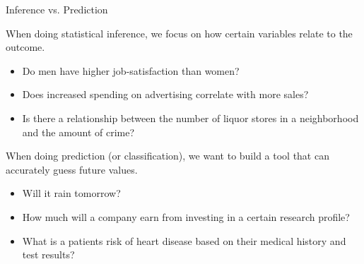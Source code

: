 \documentclass[10pt]{beamer}\usepackage[]{graphicx}\usepackage[]{color}
\begin{document}

\begin{frame}{Inference vs. Prediction}

  When doing statistical inference, we focus on how certain variables relate to
  the outcome.
  \begin{itemize}
  \item Do men have higher job-satisfaction than women?
  \item Does increased spending on advertising correlate with more sales?
  \item Is there a relationship between the number of liquor stores in a
    neighborhood and the amount of crime?
  \end{itemize}

  \vb
  \pause

  When doing prediction (or classification), we want to build a tool that can
  accurately guess future values.
  \begin{itemize}
  \item Will it rain tomorrow?
  \item How much will a company earn from investing in a certain research
    profile?
  \item What is a patients risk of heart disease based on their medical history
    and test results?
  \end{itemize}

\end{frame}



\watermarkoff %
\end{document}
